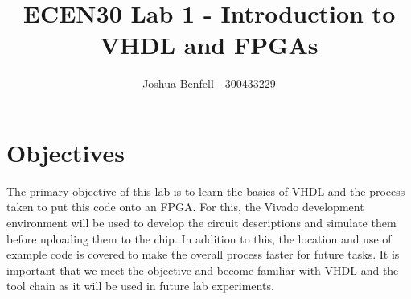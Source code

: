 \documentclass[a4paper, 12pt]{article}
\title{ECEN30 Lab 1 - Introduction to VHDL and FPGAs}
\author{Joshua Benfell - 300433229}
\begin{document}
	\maketitle
	
	\section{Objectives}
		The primary objective of this lab is to learn the basics of VHDL and the process taken to put this code onto an FPGA. For this, the Vivado development environment will be used to develop the circuit descriptions and simulate them before uploading them to the chip. In addition to this, the location and use of example code is covered to make the overall process faster for future tasks. It is important that we meet the objective and become familiar with VHDL and the tool chain as it will be used in future lab experiments.  
\end{document}
